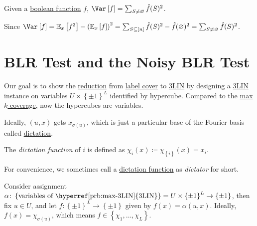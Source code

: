 \begin{claim}
	Given a \hyperref[def:boolean-function]{boolean function} \(f\), \(\Var_{}\left[f \right] = \sum_{S \neq \varnothing } \hat{f} (S)^{2}  \).
\end{claim}
\begin{explanation}
	Since \(\Var_{}\left[f \right]
	= \mathbb{E}_{x}\left[f^2 \right] - \left( \mathbb{E}_{x}\left[f \right]  \right) ^2
	= \sum_{S \subseteq [n]} \hat{f} (S)^2 - \hat{f} (\varnothing )^2
	= \sum_{S \neq \varnothing } \hat{f} (S)^2\).
\end{explanation}

\section{BLR Test and the Noisy BLR Test}
Our goal is to show the \hyperref[def:reduction]{reduction} from \hyperref[prb:label-cover]{label cover} to \hyperref[prb:max-3LIN]{3LIN} by designing a \hyperref[prb:max-3LIN]{3LIN} instance on variables \(U \times \left\{ \pm 1 \right\} ^L\) identified by hypercube. Compared to the \hyperref[prb:max-k-coverage]{max \(k\)-coverage}, now the hypercubes are variables.
\begin{center}
\end{center}

Ideally, \((u, x)\) gets \(x_{\sigma (u)}\), which is just a particular base of the Fourier basis called \hyperref[def:dictation]{dictation}.

\begin{definition}[Dictation]\label{def:dictation}
	The \emph{dictation function} of \(i\) is defined as \(\chi _i(x) \coloneqq \chi _{\left\{ i \right\} } (x) = x_i\).
\end{definition}

For convenience, we sometimes call a \hyperref[def:dictation]{dictation function} as \emph{dictator} for short.

\begin{intuition}
	Consider assignment \(\alpha \colon \left\{ \text{variables of \hyperref[prb:max-3LIN]{3LIN}}\right\} = U \times \left\{ \pm 1 \right\}^L \to \left\{ \pm 1 \right\} \), then fix \(u\in U\), and let \(f\colon \left\{ \pm 1 \right\} ^L \to  \left\{ \pm 1 \right\} \) given by \(f(x) = \alpha (u, x)\). Ideally, \(f(x) = \chi _{\sigma (u)}\), which means \(f\in \left\{ \chi _1, \ldots , \chi _L  \right\} \).
\end{intuition}

